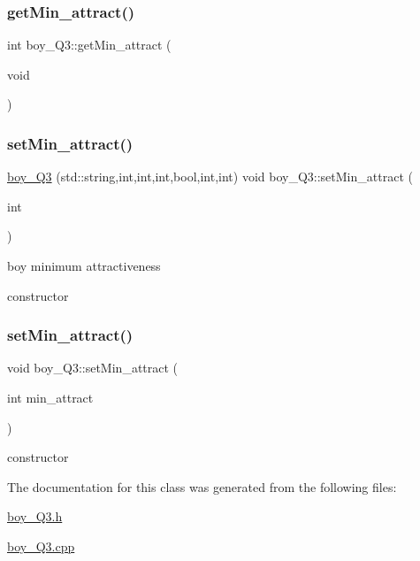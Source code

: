 \mbox{\label{classboy___q3_adf326922fe56a18158161d0d41ebfe6d}} 
\subsubsection{\texorpdfstring{get\+Min\+\_\+attract()}{getMin\_attract()}\hspace{0.1cm}{\footnotesize\ttfamily [2/2]}}
{\footnotesize\ttfamily int boy\+\_\+\+Q3\+::get\+Min\+\_\+attract (\begin{DoxyParamCaption}\item[{void}]{ }\end{DoxyParamCaption})}

\mbox{\label{classboy___q3_aeed82f5c07060bc8292dd4f119b70e00}} 
\subsubsection{\texorpdfstring{set\+Min\+\_\+attract()}{setMin\_attract()}\hspace{0.1cm}{\footnotesize\ttfamily [1/2]}}
{\footnotesize\ttfamily \hyperlink{classboy___q3}{boy\+\_\+\+Q3} (std\+::string,int,int,int,bool,int,int) void boy\+\_\+\+Q3\+::set\+Min\+\_\+attract (\begin{DoxyParamCaption}\item[{int}]{ }\end{DoxyParamCaption})}



boy minimum attractiveness 

constructor \mbox{\label{classboy___q3_a7f642a510e5cd0878a7851b2b08ecdaf}} 
\subsubsection{\texorpdfstring{set\+Min\+\_\+attract()}{setMin\_attract()}\hspace{0.1cm}{\footnotesize\ttfamily [2/2]}}
{\footnotesize\ttfamily void boy\+\_\+\+Q3\+::set\+Min\+\_\+attract (\begin{DoxyParamCaption}\item[{int}]{min\+\_\+attract }\end{DoxyParamCaption})}



constructor 



The documentation for this class was generated from the following files\+:\begin{DoxyCompactItemize}
\item 
\hyperlink{boy___q3_8h}{boy\+\_\+\+Q3.\+h}\item 
\hyperlink{boy___q3_8cpp}{boy\+\_\+\+Q3.\+cpp}\end{DoxyCompactItemize}
